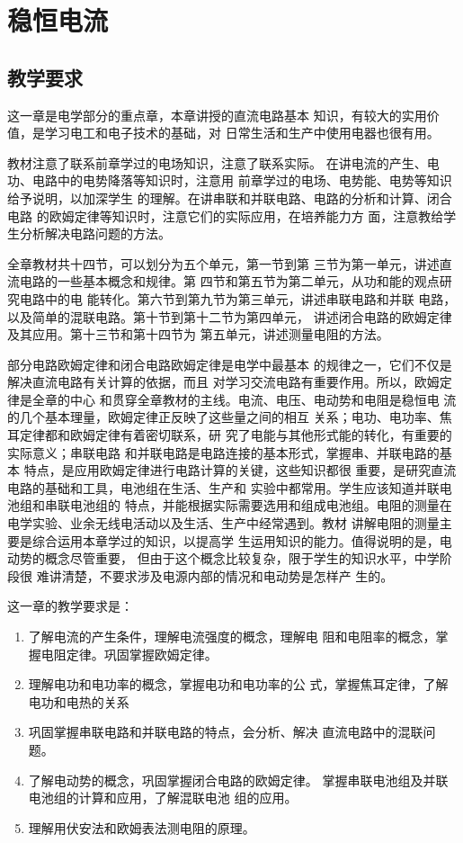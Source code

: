 \chapter{稳恒电流}\minitoc[n]
\section{教学要求}
这一章是电学部分的重点章，本章讲授的直流电路基本
知识，有较大的实用价值，是学习电工和电子技术的基础，对
日常生活和生产中使用电器也很有用。

教材注意了联系前章学过的电场知识，注意了联系实际。
在讲电流的产生、电功、电路中的电势降落等知识时，注意用
前章学过的电场、电势能、电势等知识给予说明，以加深学生
的理解。在讲串联和并联电路、电路的分析和计算、闭合电路
的欧姆定律等知识时，注意它们的实际应用，在培养能力方
面，注意教给学生分析解决电路问题的方法。

全章教材共十四节，可以划分为五个单元，第一节到第
三节为第一单元，讲述直流电路的一些基本概念和规律。第
四节和第五节为第二单元，从功和能的观点研究电路中的电
能转化。第六节到第九节为第三单元，讲述串联电路和并联
电路，以及简单的混联电路。第十节到第十二节为第四单元，
讲述闭合电路的欧姆定律及其应用。第十三节和第十四节为
第五单元，讲述测量电阻的方法。

部分电路欧姆定律和闭合电路欧姆定律是电学中最基本
的规律之一，它们不仅是解决直流电路有关计算的依据，而且
对学习交流电路有重要作用。所以，欧姆定律是全章的中心
和贯穿全章教材的主线。电流、电压、电动势和电阻是稳恒电
流的几个基本理量，欧姆定律正反映了这些量之间的相互
关系；电功、电功率、焦耳定律都和欧姆定律有着密切联系，研
究了电能与其他形式能的转化，有重要的实际意义；串联电路
和并联电路是电路连接的基本形式，掌握串、并联电路的基本
特点，是应用欧姆定律进行电路计算的关键，这些知识都很
重要，是研究直流电路的基础和工具，电池组在生活、生产和
实验中都常用。学生应该知道并联电池组和串联电池组的
特点，并能根据实际需要选用和组成电池组。电阻的测量在
电学实验、业余无线电活动以及生活、生产中经常遇到。教材
讲解电阻的测量主要是综合运用本章学过的知识，以提高学
生运用知识的能力。值得说明的是，电动势的概念尽管重要，
但由于这个概念比较复杂，限于学生的知识水平，中学阶段很
难讲清楚，不要求涉及电源内部的情况和电动势是怎样产
生的。

这一章的教学要求是：
\begin{enumerate}
\item 了解电流的产生条件，理解电流强度的概念，理解电
阻和电阻率的概念，掌握电阻定律。巩固掌握欧姆定律。
\item 理解电功和电功率的概念，掌握电功和电功率的公
式，掌握焦耳定律，了解电功和电热的关系
\item 巩固掌握串联电路和并联电路的特点，会分析、解决
直流电路中的混联问题。
\item 了解电动势的概念，巩固掌握闭合电路的欧姆定律。
掌握串联电池组及并联电池组的计算和应用，了解混联电池
组的应用。
\item 理解用伏安法和欧姆表法测电阻的原理。
\end{enumerate}

